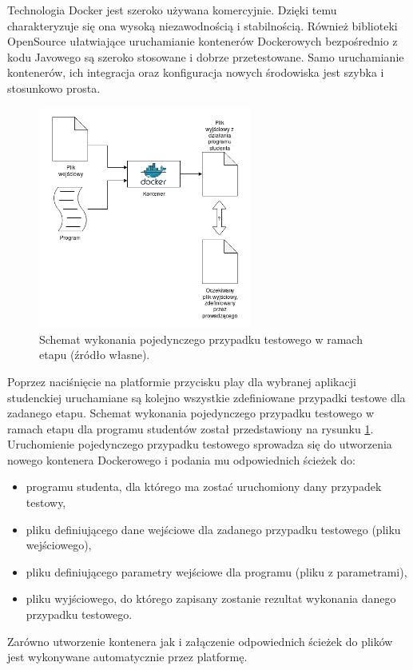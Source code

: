 Technologia Docker jest szeroko używana komercyjnie.
Dzięki temu charakteryzuje się ona wysoką niezawodnością i stabilnością.
Również biblioteki OpenSource ułatwiające uruchamianie kontenerów Dockerowych bezpośrednio z kodu Javowego są szeroko stosowane i dobrze przetestowane.
Samo uruchamianie kontenerów, ich integracja oraz konfiguracja nowych środowiska jest szybka i stosunkowo prosta.

\begin{figure}[h]
    \centering
    \includegraphics[width = 7cm]{chapter02/single_test_case.png}
    \caption{Schemat wykonania pojedynczego przypadku testowego w ramach etapu (źródło własne).}
    \label{fig:single-test-case}
\end{figure}

Poprzez naciśnięcie na platformie przycisku play dla wybranej aplikacji studenckiej uruchamiane są kolejno wszystkie zdefiniowane przypadki testowe dla zadanego etapu.
Schemat wykonania pojedynczego przypadku testowego w ramach etapu dla programu studentów został przedstawiony na rysunku \ref{fig:single-test-case}.
Uruchomienie pojedynczego przypadku testowego sprowadza się do utworzenia nowego kontenera Dockerowego i podania mu odpowiednich ścieżek do:
\begin{itemize}
    \item programu studenta, dla którego ma zostać uruchomiony dany przypadek testowy,
    \item pliku definiującego dane wejściowe dla zadanego przypadku testowego (pliku wejściowego),
    \item pliku definiującego parametry wejściowe dla programu (pliku z parametrami),
    \item pliku wyjściowego, do którego zapisany zostanie rezultat wykonania danego przypadku testowego.
\end{itemize}
Zarówno utworzenie kontenera jak i załączenie odpowiednich ścieżek do plików jest wykonywane automatycznie przez platformę.


